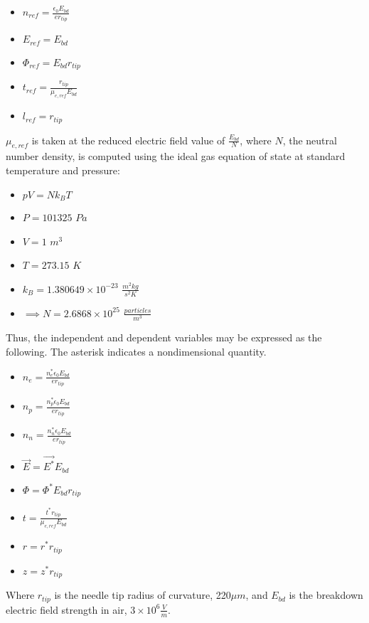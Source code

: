 \documentclass[12pt, a4paper]{report}
\begin{document}
\begin{itemize}
    \item $n_{ref} = \frac{\epsilon_0 E_{bd}}{e r_{tip}}$
    \item $E_{ref} = E_{bd}$
    \item $\Phi_{ref} = E_{bd}r_{tip}$
    \item $t_{ref} = \frac{r_{tip}}{\mu_{e,ref} E_{bd}}$
    \item $l_{ref} = r_{tip}$
\end{itemize}

$\mu_{e,ref}$ is taken at the reduced electric field value of $\frac{E_{bd}}{N}$, where $N$, the neutral number density, is computed using the ideal gas equation of state at standard temperature and pressure:

\begin{itemize}
    \item $pV = Nk_BT$
    \item $P = 101325$ $Pa$
    \item $V=1$ $m^3$
    \item $T = 273.15$ $K$
    \item $k_B = 1.380649\times 10 ^{-23}$ $\frac{m^2kg}{s^{2} K}$
    \item $\implies N = 2.6868 \times 10 ^{25}$ $\frac{particles}{m^3}$
\end{itemize}

\noindent
Thus, the independent and dependent variables may be expressed as the following. The asterisk indicates a nondimensional quantity.

\begin{itemize}
    \item $n_e = \frac{n^*_e \epsilon_0 E_{bd}}{e r_{tip}}$
    \item $n_p = \frac{n^*_p \epsilon_0 E_{bd}}{e r_{tip}}$
    \item $n_n = \frac{n^*_n \epsilon_0 E_{bd}}{e r_{tip}}$
    \item $\vec{E} = \vec{E^*}E_{bd}$
    \item $\Phi = \Phi^* E_{bd} r_{tip}$
    \item $t = \frac{t^*r_{tip}}{\mu_{e,ref} E_{bd}}$
    \item $r = r^*r_{tip}$
    \item $z = z^*r_{tip}$
\end{itemize}

\noindent
Where $r_{tip}$ is the needle tip radius of curvature, 220$\mu m$, and $E_{bd}$ is the breakdown electric field strength in air, $3\times10^6 \frac{V}{m}$.\\
\end{document}
